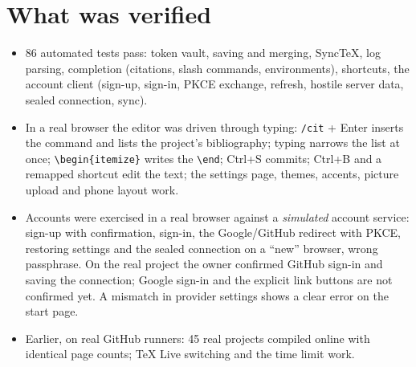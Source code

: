 \documentclass[11pt,a4paper]{article}
\begin{document}
\section{What was verified}
\begin{itemize}
  \item 86 automated tests pass: token vault, saving and merging, SyncTeX, log parsing, completion (citations, slash commands, environments), shortcuts, the account client
        (sign-up, sign-in, PKCE exchange, refresh, hostile server data, sealed connection, sync).
  \item In a real browser the editor was driven through typing: \texttt{/cit} + Enter inserts the command and lists the project's bibliography; typing narrows the list at once; \texttt{\textbackslash begin\{itemize\}}
        writes the \texttt{\textbackslash end}; Ctrl+S commits; Ctrl+B and a remapped shortcut edit the text; the settings page, themes, accents, picture upload and phone layout work.
  \item Accounts were exercised in a real browser against a \emph{simulated} account service: sign-up with confirmation, sign-in, the Google/GitHub redirect with PKCE, restoring settings and the
        sealed connection on a ``new'' browser, wrong passphrase. On the real project the owner confirmed GitHub sign-in and saving the connection; Google sign-in and the explicit link buttons are not confirmed yet. A mismatch in provider settings shows a clear error on the start page.
  \item Earlier, on real GitHub runners: 45 real projects compiled online with identical page counts; \TeX{} Live switching and the time limit work.
\end{itemize}
\end{document}
